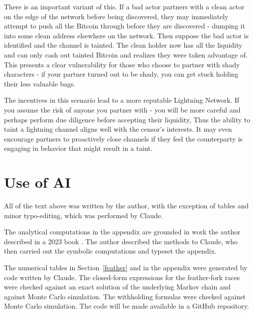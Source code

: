 \documentclass{article}%
\begin{document}
There is an important variant of this.  If a bad actor partners with a clean
actor on the edge of the network before being discovered, they may immediately
attempt to push all the Bitcoin through before they are discovered - dumping
it into some clean address elsewhere on the network.  Then suppose the bad actor is
identified and the channel is tainted.  The clean holder now has all the
liquidity and can only cash out tainted Bitcoin and realizes they were taken
advantage of.  This presents a clear vulnerability for those who choose to
partner with shady characters - if your partner turned out to be shady, you
can get stuck holding their less valuable bags.

The incentives in this scenario lead to a more reputable Lightning Network.
 If you assume the risk of anyone you partner with - you will be more careful
and perhaps perform due diligence before accepting their liquidity, Thus the ability to taint a
lightning channel aligns well with the censor's interests.  It may even
encourage partners to proactively close channels if they feel the counterparty
is engaging in behavior that might result in a taint.

\bigskip

\section{Use of AI}

All of the text above was written by the author, with the exception of tables and minor typo-editing, which was performed by Claude.  

The analytical computations in the appendix are grounded in work the author
described in a 2023 book \cite{Warren23}. The author described the methods to Claude, who then carried out the
symbolic computations and typeset the appendix.  

The numerical tables in Section~\ref{feather} and in the appendix were
generated by code written by Claude. The closed-form expressions for the
feather-fork races were checked against an exact solution of the underlying
Markov chain and against Monte Carlo simulation. The withholding formulas were
checked against Monte Carlo simulation. The code will be made available in a
GitHub repository.


\bigskip




\appendix

\end{document}
